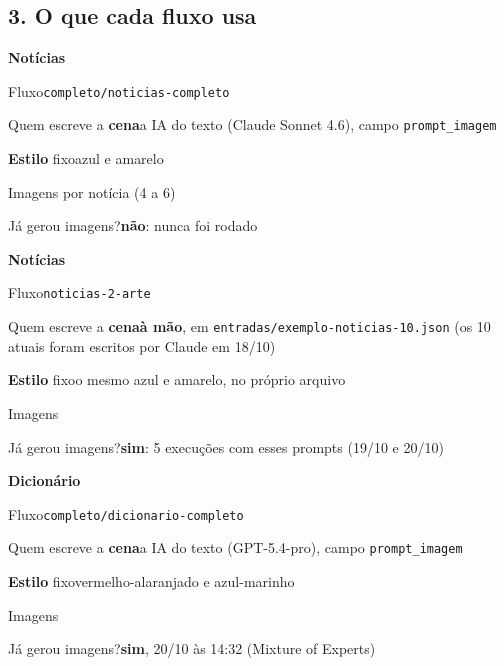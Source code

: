 \subsection*{3. O que cada fluxo usa}

\begin{recordbox}
{\bfseries\color{accent} Notícias}\par
{\small\color{muted} Fluxo}\quad \nolinkurl{completo/noticias-completo}\par
{\small\color{muted} Quem escreve a \textbf{cena}}\quad a IA do texto (Claude Sonnet 4.6), campo \nolinkurl{prompt_imagem}\par
{\small\color{muted} \textbf{Estilo} fixo}\quad azul e amarelo\par
{\small\color{muted} Imagens} por notícia (4 a 6)\par
{\small\color{muted} Já gerou imagens?}\quad \textbf{não}: nunca foi rodado\par
\end{recordbox}
\begin{recordbox}
{\bfseries\color{accent} Notícias}\par
{\small\color{muted} Fluxo}\quad \nolinkurl{noticias-2-arte}\par
{\small\color{muted} Quem escreve a \textbf{cena}}\quad \textbf{à mão}, em \nolinkurl{entradas/exemplo-noticias-10.json} (os 10 atuais foram escritos por Claude em 18/10)\par
{\small\color{muted} \textbf{Estilo} fixo}\quad o mesmo azul e amarelo, no próprio arquivo\par
{\small\color{muted} Imagens}\par
{\small\color{muted} Já gerou imagens?}\quad \textbf{sim}: 5 execuções com esses prompts (19/10 e 20/10)\par
\end{recordbox}
\begin{recordbox}
{\bfseries\color{accent} Dicionário}\par
{\small\color{muted} Fluxo}\quad \nolinkurl{completo/dicionario-completo}\par
{\small\color{muted} Quem escreve a \textbf{cena}}\quad a IA do texto (GPT-5.4-pro), campo \nolinkurl{prompt_imagem}\par
{\small\color{muted} \textbf{Estilo} fixo}\quad vermelho-alaranjado e azul-marinho\par
{\small\color{muted} Imagens}\par
{\small\color{muted} Já gerou imagens?}\quad \textbf{sim}, 20/10 às 14:32 (Mixture of Experts)\par
\end{recordbox}
